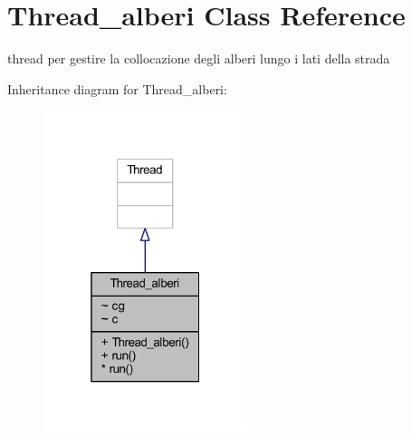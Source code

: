 \hypertarget{classcargame_1_1_thread__alberi}{}\section{Thread\+\_\+alberi Class Reference}
\label{classcargame_1_1_thread__alberi}


thread per gestire la collocazione degli alberi lungo i lati della strada  




Inheritance diagram for Thread\+\_\+alberi\+:
\nopagebreak
\begin{figure}[H]
\begin{center}
\leavevmode
\includegraphics[width=169pt]{classcargame_1_1_thread__alberi__inherit__graph}
\end{center}
\end{figure}


